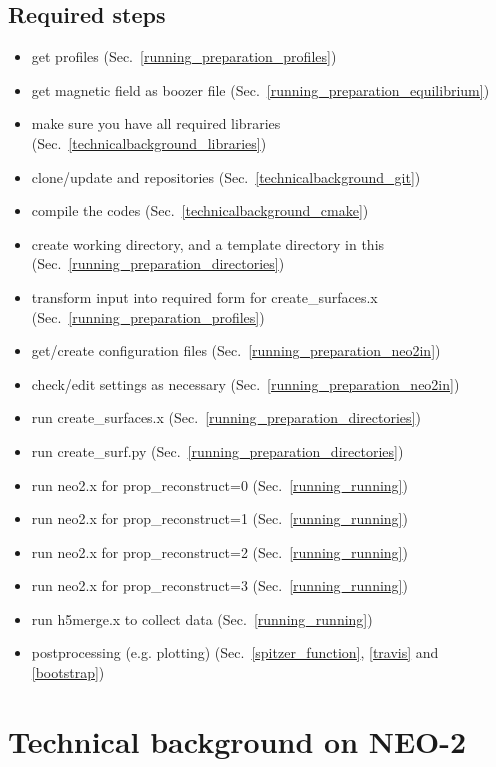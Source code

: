 \documentclass{article}
\newcommand{\vv}[1]{\texttt{\detokenize{#1}}}
\begin{document}
\subsection{Required steps}
\begin{itemize}
  \item get profiles (Sec.~\ref{running_preparation_profiles})
  \item get magnetic field as boozer file (Sec.~\ref{running_preparation_equilibrium})
  \item make sure you have all required libraries (Sec.~\ref{technicalbackground_libraries})
  \item clone/update \vv{libneo} and \vv{neo-2} repositories (Sec.~\ref{technicalbackground_git})
  \item compile the codes (Sec.~\ref{technicalbackground_cmake})
  \item create working directory, and a template directory in this (Sec.~\ref{running_preparation_directories})
  \item transform input into required form for create\_surfaces.x (Sec.~\ref{running_preparation_profiles})
  \item get/create configuration files (Sec.~\ref{running_preparation_neo2in})
  \item check/edit settings as necessary (Sec.~\ref{running_preparation_neo2in})
  \item run create\_surfaces.x (Sec.~\ref{running_preparation_directories})
  \item run create\_surf.py (Sec.~\ref{running_preparation_directories})
  \item run neo2.x for prop\_reconstruct=0 (Sec.~\ref{running_running})
  \item run neo2.x for prop\_reconstruct=1 (Sec.~\ref{running_running})
  \item run neo2.x for prop\_reconstruct=2 (Sec.~\ref{running_running})
  \item run neo2.x for prop\_reconstruct=3 (Sec.~\ref{running_running})
  \item run h5merge.x to collect data (Sec.~\ref{running_running})
  \item postprocessing (e.g. plotting) (Sec.~\ref{spitzer_function}, \ref{travis} and \ref{bootstrap})
\end{itemize}

\section{Technical background on NEO-2}
\end{document}
